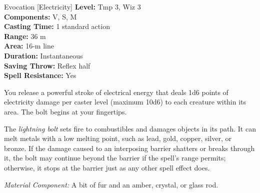{Evocation [Electricity]}
{
	\textbf{Level:}
	Tmp 3, Wiz 3\\
	\textbf{Components:}
	V, S, M\\
	\textbf{Casting Time:}
	1 standard action\\
	\textbf{Range:}
	36 m\\
	\textbf{Area:}
	16-m line\\
	\textbf{Duration:}
	Instantaneous\\
	\textbf{Saving Throw:}
	Reflex half\\
	\textbf{Spell Resistance:}
	Yes\\
}
{
	You release a powerful stroke of electrical energy that deals 1d6 points of electricity damage per caster level (maximum 10d6) to each creature within its area. The bolt begins at your fingertips.

	The \emph{lightning bolt} sets fire to combustibles and damages objects in its path. It can melt metals with a low melting point, such as lead, gold, copper, silver, or bronze. If the damage caused to an interposing barrier shatters or breaks through it, the bolt may continue beyond the barrier if the spell's range permits; otherwise, it stops at the barrier just as any other spell effect does.

	\textit{Material Component:}
	A bit of fur and an amber, crystal, or glass rod.

}
